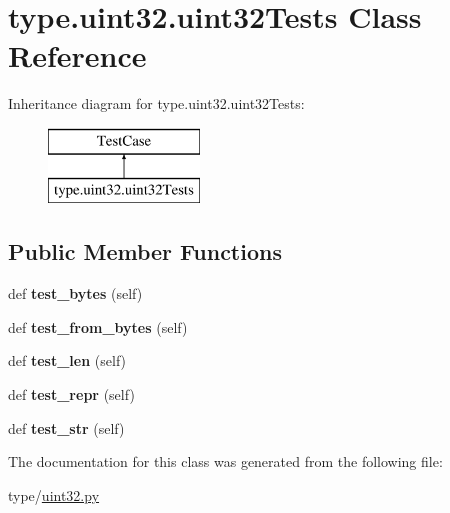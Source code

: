 \hypertarget{classtype_1_1uint32_1_1uint32Tests}{}\section{type.\+uint32.\+uint32\+Tests Class Reference}
\label{classtype_1_1uint32_1_1uint32Tests}
Inheritance diagram for type.\+uint32.\+uint32\+Tests\+:\begin{figure}[H]
\begin{center}
\leavevmode
\includegraphics[height=2.000000cm]{classtype_1_1uint32_1_1uint32Tests}
\end{center}
\end{figure}
\subsection*{Public Member Functions}
\begin{DoxyCompactItemize}
\item 
\mbox{\label{classtype_1_1uint32_1_1uint32Tests_a1e10fc8f36d6592ad511eb3e8a9323f5}} 
def {\bfseries test\+\_\+bytes} (self)
\item 
\mbox{\label{classtype_1_1uint32_1_1uint32Tests_a5531321f41a55e7e6631c7e46db16fba}} 
def {\bfseries test\+\_\+from\+\_\+bytes} (self)
\item 
\mbox{\label{classtype_1_1uint32_1_1uint32Tests_a4c16da5a2d891f673d8c1927f8811e01}} 
def {\bfseries test\+\_\+len} (self)
\item 
\mbox{\label{classtype_1_1uint32_1_1uint32Tests_a1325bb5ef8229b50036eb9fecb75fd88}} 
def {\bfseries test\+\_\+repr} (self)
\item 
\mbox{\label{classtype_1_1uint32_1_1uint32Tests_a678cf7c7ffda4caf2dad51239054810b}} 
def {\bfseries test\+\_\+str} (self)
\end{DoxyCompactItemize}


The documentation for this class was generated from the following file\+:\begin{DoxyCompactItemize}
\item 
type/\mbox{\hyperlink{uint32_8py}{uint32.\+py}}\end{DoxyCompactItemize}
